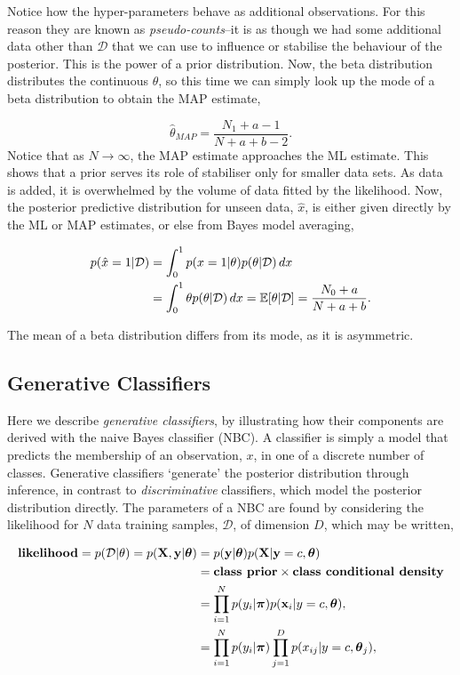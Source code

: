 \documentclass[11pt]{amsart}
\begin{document}
Notice how the hyper-parameters behave as additional observations. For this reason they are known as \emph{pseudo-counts}--it is as though we had some additional data other than $\mathcal{D}$ that we can use to influence or stabilise the behaviour of the posterior. This is the power of a prior distribution. Now, the beta distribution distributes the continuous $\theta$, so this time we can simply look up the mode of a beta distribution to obtain the MAP estimate,

$$\hat\theta_{MAP} = \frac{N_1 + a - 1}{N + a + b - 2}.$$ Notice that as $N \to \infty$, the MAP estimate approaches the ML estimate. This shows that a prior serves its role of stabiliser only for smaller data sets. As data is added, it is overwhelmed by the volume of data fitted by the likelihood. Now, the posterior predictive distribution for unseen data, $\hat{x}$, is either given directly by the ML or MAP estimates, or else from Bayes model averaging,

\begin{align}
p(\hat{x} = 1|\mathcal{D}) &= \int_0^1 p(x = 1 |\theta)p(\theta|\mathcal{D})\mathop{dx} \notag \\
&= \int_0^1 \theta p(\theta|\mathcal{D})\mathop{dx} = \mathbb{E}[\theta|\mathcal{D}] = \frac{N_0 + a}{N + a + b}. \notag
\end{align}

The mean of a beta distribution differs from its mode, as it is asymmetric.

\subsection{Generative Classifiers}

Here we describe \emph{generative classifiers}, by illustrating how their components are derived with the naive Bayes classifier (NBC). A classifier is simply a model that predicts the membership of an observation, $x$, in one of a discrete number of classes. Generative classifiers `generate' the posterior distribution through inference, in contrast to \emph{discriminative} classifiers, which model the posterior distribution directly. The parameters of a NBC are found by considering the likelihood for $N$ data training samples, $\mathcal{D}$, of dimension $D$, which may be written,

\begin{align}
\textbf{likelihood} = p(\mathcal{D}|\theta) = p(\mathbf{X}, \mathbf{y}|\boldsymbol\theta) &= p(\mathbf{y}|\boldsymbol\theta)p(\mathbf{X}|\mathbf{y}=c,\boldsymbol\theta) \notag \\
&= \textbf{class prior} \times \textbf{class conditional density} \notag \\
&= \prod_{i=1}^N p(y_i|\boldsymbol\pi)p(\mathbf{x}_i|y=c,\boldsymbol\theta), \label{eq:iid} \\
&= \prod_{i=1}^N p(y_i|\boldsymbol\pi)\prod_{j = 1}^D p(x_{ij}|y=c,\boldsymbol\theta_j), \label{eq:nbc}
\end{align}
\end{document}
